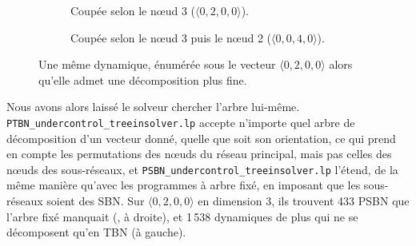 \documentclass[12pt, a4paper]{article}
\begin{document}
\begin{figure}[H]
    \centering
    \begin{subfigure}{0.48\linewidth}
        \centering
        \caption{Coupée selon le nœud 3 ($\langle 0,2,0,0\rangle$).}
    \end{subfigure}
    \hfill
    \begin{subfigure}{0.48\linewidth}
        \centering
        \caption{Coupée selon le nœud 3 puis le nœud 2 ($\langle 0,0,4,0\rangle$).}
    \end{subfigure}
    \caption{Une même dynamique, énumérée sous le vecteur $\langle 0,2,0,0\rangle$ alors qu'elle admet une décomposition plus fine.}
    \label{fig:trop-decomposable}
\end{figure}

Nous avons alors laissé le solveur chercher l'arbre lui-même.
\texttt{PTBN\_undercontrol\_treeinsolver.lp} accepte n'importe quel arbre de décomposition d'un vecteur donné, quelle que soit son orientation, ce qui prend en compte les permutations des nœuds du réseau principal, mais pas celles des nœuds des sous-réseaux, et \texttt{PSBN\_undercontrol\_treeinsolver.lp} l'étend, de la même manière qu'avec les programmes à arbre fixé, en imposant que les sous-réseaux soient des SBN.
Sur $\langle 0,2,0,0\rangle$ en dimension 3, ils trouvent 433 PSBN que l'arbre fixé manquait (, à droite), et 1\,538 dynamiques de plus qui ne se décomposent qu'en TBN (à gauche).
\end{document}
